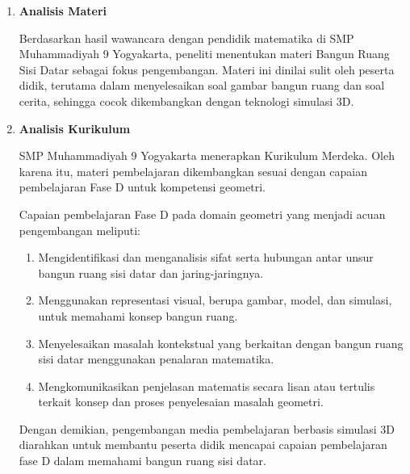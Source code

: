 \begin{enumerate}[leftmargin=1cm, label=\arabic*.]
\begin{enumerate}[label=\textbf{\alph*.}]
        \hspace*{1cm}Berdasarkan permasalahan tersebut, peneliti berniat menguji kelayakan media pembelajaran berbasis simulasi 3D untuk meningkatkan ketertarikan dan membantu pemahaman peserta didik terhadap materi bangun ruang sisi datar.

        \item \textbf{Analisis Materi}
        
        \hspace*{1cm}Berdasarkan hasil wawancara dengan pendidik matematika di SMP Muhammadiyah 9 Yogyakarta, peneliti menentukan materi Bangun Ruang Sisi Datar sebagai fokus pengembangan. Materi ini dinilai sulit oleh peserta didik, terutama dalam menyelesaikan soal gambar bangun ruang dan soal cerita, sehingga cocok dikembangkan dengan teknologi simulasi 3D.

        \item \textbf{Analisis Kurikulum}
        
        \hspace*{1cm}SMP Muhammadiyah 9 Yogyakarta menerapkan Kurikulum Merdeka. Oleh karena itu, materi pembelajaran dikembangkan sesuai dengan capaian pembelajaran Fase D untuk kompetensi geometri.

        \hspace*{1cm}Capaian pembelajaran Fase D pada domain geometri yang menjadi acuan pengembangan meliputi:
        \begin{enumerate}[label=\alph*)]
            \item Mengidentifikasi dan menganalisis sifat serta hubungan antar unsur bangun ruang sisi datar dan jaring-jaringnya.
            \item Menggunakan representasi visual, berupa gambar, model, dan simulasi, untuk memahami konsep bangun ruang.
            \item Menyelesaikan masalah kontekstual yang berkaitan dengan bangun ruang sisi datar menggunakan penalaran matematika.
            \item Mengkomunikasikan penjelasan matematis secara lisan atau tertulis terkait konsep dan proses penyelesaian masalah geometri.
        \end{enumerate}

        \hspace*{1cm}Dengan demikian, pengembangan media pembelajaran berbasis simulasi 3D diarahkan untuk membantu peserta didik mencapai capaian pembelajaran fase D dalam memahami bangun ruang sisi datar.
    \end{enumerate}


\end{enumerate}
